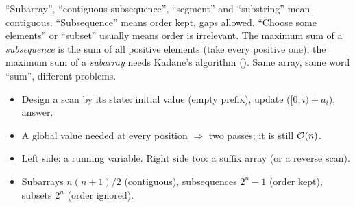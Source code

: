 \begin{warningbox}
``Subarray'', ``contiguous subsequence'', ``segment'' and ``substring'' mean contiguous. ``Subsequence'' means order kept, gaps allowed. ``Choose some elements'' or ``subset'' usually means order is irrelevant. The maximum sum of a \emph{subsequence} is the sum of all positive elements (take every positive one); the maximum sum of a \emph{subarray} needs Kadane's algorithm (). Same array, same word ``sum'', different problems.
\end{warningbox}

\begin{checklistbox}
\begin{itemize}[leftmargin=*]
    \item[$\square$] Design a scan by its state: initial value (empty prefix), update ($[0,i) + a_i$), answer.
    \item[$\square$] A global value needed at every position $\Rightarrow$ two passes; it is still $\mathcal{O}(n)$.
    \item[$\square$] Left side: a running variable. Right side too: a suffix array (or a reverse scan).
    \item[$\square$] Subarrays $n(n+1)/2$ (contiguous), subsequences $2^n - 1$ (order kept), subsets $2^n$ (order ignored).
\end{itemize}
\end{checklistbox}
